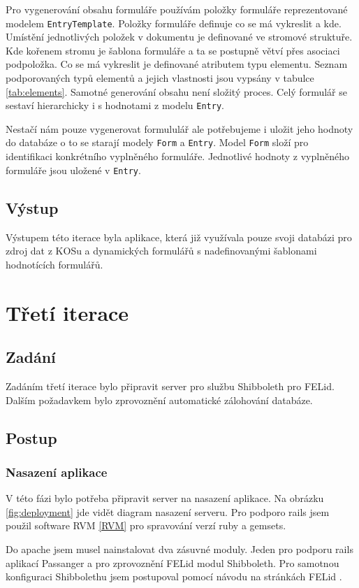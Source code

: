 Pro vygenerování obsahu formuláře používám položky formuláře reprezentované modelem \verb|EntryTemplate|. Položky formuláře definuje co se má vykreslit a kde. Umístění jednotlivých položek v dokumentu je definované ve stromové struktuře. Kde kořenem stromu je šablona formuláře a ta se postupně větví přes asociaci podpoložka. Co se má vykreslit je definované atributem typu elementu. Seznam podporovaných typů elementů a jejich vlastnosti jsou vypsány v tabulce \ref{tab:elements}. Samotné generování obsahu není složitý proces. Celý formulář se sestaví hierarchicky i s hodnotami z modelu \verb|Entry|.

Nestačí nám pouze vygenerovat formululář ale potřebujeme i uložit jeho hodnoty do databáze o to se starají modely \verb|Form| a \verb|Entry|. Model \verb|Form| složí pro identifikaci konkrétního vyplněného formuláře. Jednotlivé hodnoty z vyplněného formuláře jsou uložené v \verb|Entry|.

\subsection{Výstup} 
Výstupem této iterace byla aplikace, která již využívala pouze svoji databázi pro zdroj dat z KOSu a dynamických formulářů s nadefinovanými šablonami hodnotících formulářů.

\section{Třetí iterace}
\subsection{Zadání}
Zadáním třetí iterace bylo připravit server pro službu Shibboleth pro FELid. Dalším požadavkem bylo zprovoznění automatické zálohování databáze.

\subsection{Postup}
\subsubsection{Nasazení aplikace}
V této fázi bylo potřeba připravit server na nasazení aplikace. Na obrázku \ref{fig:deployment} jde vidět diagram nasazení serveru. Pro podporo rails jsem použil software RVM \ref{RVM} pro spravování verzí ruby a gemsets.

Do apache jsem musel nainstalovat dva zásuvné moduly. Jeden pro podporu rails aplikací Passanger a pro zprovoznění FELid modul Shibboleth. Pro samotnou konfiguraci Shibbolethu jsem postupoval pomocí návodu na stránkách FELid \cite{felid_navod}.

